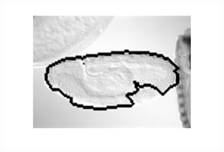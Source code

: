 \documentclass{article} %
\begin{document}
\begin{figure}[htbp]
{\includegraphics[scale=0.3]{hPT6_MRF2.pdf}
}
\end{figure}
\end{document}
